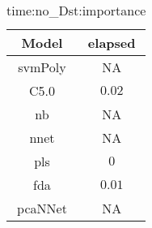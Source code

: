 \begin{table}[!ht]
	\centering
	\begin{tabular}{|c|c|}
		\hline
		Model & elapsed \\ \hline
		svmPoly & NA \\ \hline
		C5.0 & $0.02$ \\ \hline
		nb & NA \\ \hline
		nnet & NA \\ \hline
		pls & $0$ \\ \hline
		fda & $0.01$ \\ \hline
		pcaNNet & NA \\ \hline
	\end{tabular}
	\caption{time:no_Dst:importance}
	\label{tab:time:no_Dst:importance}
\end{table}
